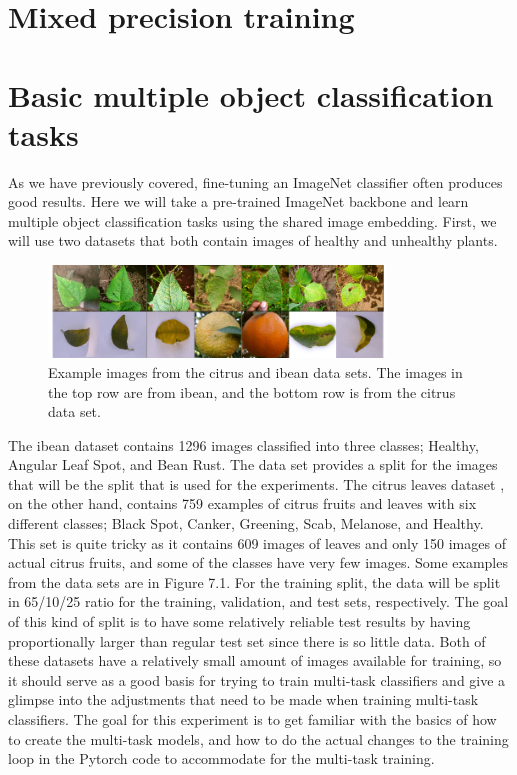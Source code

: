 \section{Mixed precision training}

\section{Basic multiple object classification tasks}
As we have previously covered, fine-tuning an ImageNet classifier often produces good results.
Here we will take a pre-trained ImageNet backbone and learn multiple object classification tasks using the shared image embedding.
First, we will use two datasets that both contain images of healthy and unhealthy plants.

\begin{figure}[h!]
    \centering
    \includegraphics[width=0.8\textwidth]{imgs/citrus_beans_examples.png}
    \caption{Example images from the citrus and ibean data sets.
        The images in the top row are from ibean, and the bottom row is from the citrus data set.}
\end{figure}

The ibean dataset \citep{beansdata} contains 1296 images classified into three classes; Healthy, Angular Leaf Spot, and Bean Rust.
The data set provides a split for the images that will be the split that is used for the experiments.
The citrus leaves dataset \citep{citrusdata}, on the other hand, contains 759 examples of citrus fruits and leaves with six different classes; Black Spot, Canker, Greening, Scab, Melanose, and Healthy.
This set is quite tricky as it contains 609 images of leaves and only 150 images of actual citrus fruits, and some of the classes have very few images.
Some examples from the data sets are in Figure 7.1.
For the training split, the data will be split in 65/10/25 ratio for the training, validation, and test sets, respectively.
The goal of this kind of split is to have some relatively reliable test results by having proportionally larger than regular test set since there is so little data.
Both of these datasets have a relatively small amount of images available for training, so it should serve as a good basis for trying to train multi-task classifiers and give a glimpse into the adjustments that need to be made when training multi-task classifiers.
The goal for this experiment is to get familiar with the basics of how to create the multi-task models, and how to do the actual changes to the training loop in the Pytorch code to accommodate for the multi-task training.

